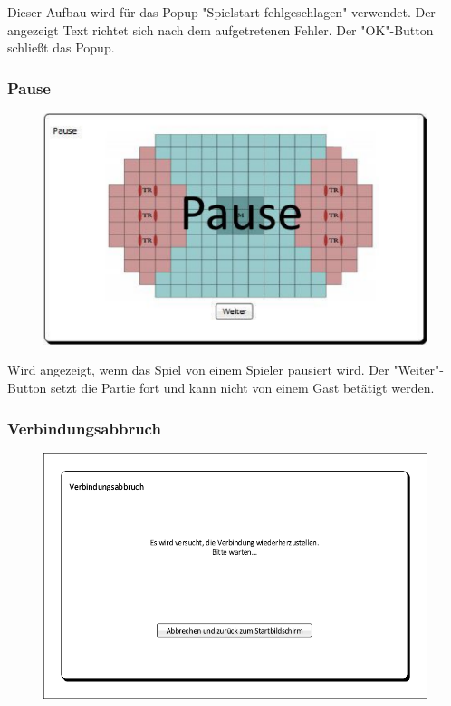 Dieser Aufbau wird für das Popup "Spielstart fehlgeschlagen" verwendet. Der angezeigt Text richtet sich nach dem aufgetretenen Fehler. Der "OK"-Button schließt das Popup.

\subsubsection{Pause}
\begin{figure}[H]
	\centering
	\includegraphics[scale=0.8]{images/Pause.pdf}
\end{figure}

Wird angezeigt, wenn das Spiel von einem Spieler pausiert wird. Der "Weiter"-Button setzt die Partie fort und kann nicht von einem Gast betätigt werden.

\subsubsection{Verbindungsabbruch}
\begin{figure}[H]
	\centering
	\includegraphics[scale=0.8]{images/Verbindungsabbruch.pdf}
\end{figure}

